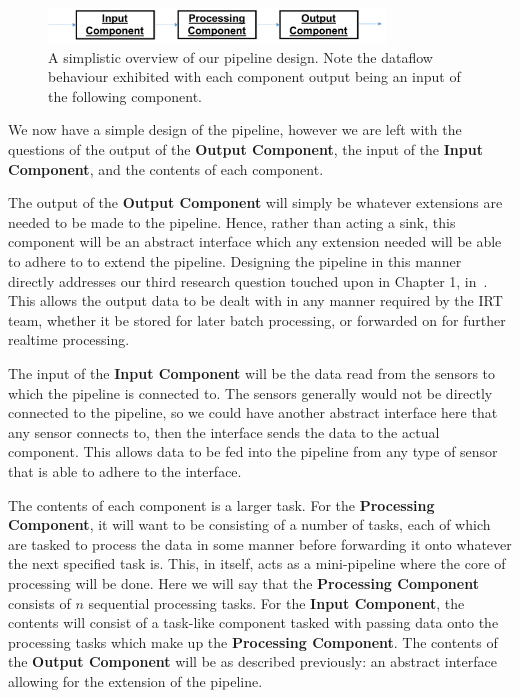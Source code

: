 \begin{figure}[ht]
  \centering
  \includegraphics[width=0.8\textwidth]{includes/figures/fig_pipeline_simple}
  \caption{A simplistic overview of our pipeline design. Note the dataflow behaviour exhibited with each component output
  being an input of the following component.}
  \label{fig:pipeline_simple}
\end{figure}

We now have a simple design of the pipeline, however we are left with the questions of the output of the \textbf{Output Component},
the input of the \textbf{Input Component}, and the contents of each component.

The output of the \textbf{Output Component}
will simply be whatever extensions are needed to be made to the pipeline. Hence, rather than acting a sink, this component
will be an abstract interface which any extension needed will be able to adhere to to extend the pipeline. Designing the pipeline
in this manner directly addresses our third research question touched upon in Chapter 1, in~.
This allows the output data to be dealt with in any manner required by the IRT team, whether it be stored for later
batch processing, or forwarded on for further realtime processing.

The input of the \textbf{Input Component} will be the data read from the sensors to which the pipeline is connected to.
The sensors generally would not be directly connected to the pipeline, so we could have another abstract interface here
that any sensor connects to, then the interface sends the data to the actual component. This allows data to be fed into
the pipeline from any type of sensor that is able to adhere to the interface.

The contents of each component is a larger task. For the \textbf{Processing Component}, it will want to be consisting
of a number of tasks, each of which are tasked to process the data in some manner before forwarding it onto whatever
the next specified task is. This, in itself, acts as a mini-pipeline where the core of processing will be done. Here
we will say that the \textbf{Processing Component} consists of $n$ sequential processing tasks. For the \textbf{Input Component},
the contents will consist of a task-like component tasked with passing data onto the processing tasks which make up the
\textbf{Processing Component}. The contents of the
\textbf{Output Component} will be as described previously: an abstract interface allowing for the extension of the pipeline.

